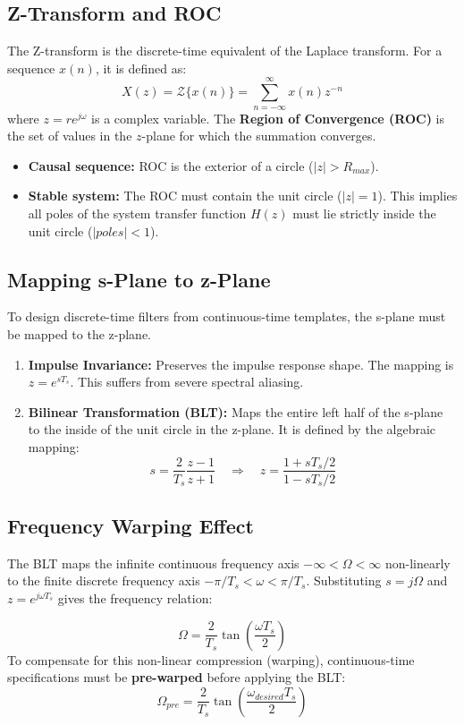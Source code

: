 \documentclass[12pt,a4paper]{article}
\begin{document}
\subsection{Z-Transform and ROC}
The Z-transform is the discrete-time equivalent of the Laplace transform. For a sequence $x(n)$, it is defined as:
\[
X(z) = \mathcal{Z}\{x(n)\} = \sum_{n=-\infty}^{\infty} x(n) z^{-n}
\]
where $z = r e^{j\omega}$ is a complex variable. The \textbf{Region of Convergence (ROC)} is the set of values in the $z$-plane for which the summation converges.
\begin{itemize}[leftmargin=*, itemsep=2pt]
  \item \textbf{Causal sequence:} ROC is the exterior of a circle ($|z| > R_{max}$).
  \item \textbf{Stable system:} The ROC must contain the unit circle ($|z| = 1$). This implies all poles of the system transfer function $H(z)$ must lie strictly inside the unit circle ($|poles| < 1$).
\end{itemize}

\subsection{Mapping s-Plane to z-Plane}
To design discrete-time filters from continuous-time templates, the s-plane must be mapped to the z-plane.
\begin{enumerate}[label=\textbf{\arabic*.}, leftmargin=*, itemsep=3pt]
  \item \textbf{Impulse Invariance:} Preserves the impulse response shape. The mapping is $z = e^{sT_s}$. This suffers from severe spectral aliasing.
  \item \textbf{Bilinear Transformation (BLT):} Maps the entire left half of the s-plane to the inside of the unit circle in the z-plane. It is defined by the algebraic mapping:
  \[
  s = \frac{2}{T_s} \frac{z - 1}{z + 1} \quad \Rightarrow \quad z = \frac{1 + s T_s/2}{1 - s T_s/2}
  \]
\end{enumerate}

\subsection{Frequency Warping Effect}
The BLT maps the infinite continuous frequency axis $-\infty < \Omega < \infty$ non-linearly to the finite discrete frequency axis $-\pi/T_s < \omega < \pi/T_s$. Substituting $s = j\Omega$ and $z = e^{j\omega T_s}$ gives the frequency relation:
\begin{tcolorbox}[formulabox, title={\textbf{Frequency Warping and Pre-warping Relations}}]
\[
\Omega = \frac{2}{T_s} \tan\left(\frac{\omega T_s}{2}\right)
\]
To compensate for this non-linear compression (warping), continuous-time specifications must be \textbf{pre-warped} before applying the BLT:
\[
\Omega_{pre} = \frac{2}{T_s} \tan\left(\frac{\omega_{desired} T_s}{2}\right)
\]
\end{tcolorbox}
\end{document}
